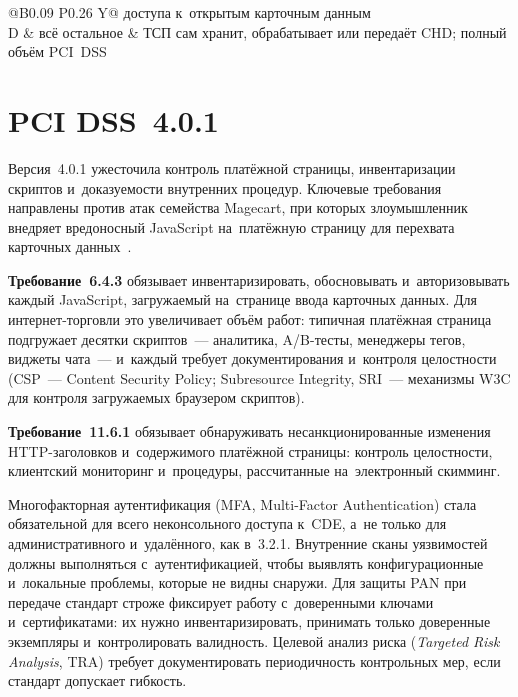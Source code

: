 \begin{table}[tbp]
\begin{minipage}{\textwidth}
\begin{tabularx}{\textwidth}{@{}B{0.09\textwidth} P{0.26\textwidth} Y@{}}
      доступа к~открытым карточным данным \\
      \rowsep
      D & всё остальное &
      ТСП сам хранит, обрабатывает или передаёт CHD; полный объём PCI~DSS \\
      \bottomrule
    \end{tabularx}
    \par\smallskip
  \end{minipage}\par
  \endgroup
\end{table}

\section{PCI DSS~4.0.1}\label{sec:pci-401}

Версия~4.0.1 ужесточила контроль платёжной страницы, инвентаризации скриптов
и~доказуемости внутренних процедур. Ключевые требования направлены против атак
семейства Magecart, при которых злоумышленник внедряет вредоносный JavaScript
на~платёжную страницу для перехвата карточных данных~\cite{pci-dss-4}.

\textbf{Требование~6.4.3} обязывает инвентаризировать, обосновывать
и~авторизовывать каждый JavaScript, загружаемый на~странице ввода карточных
данных. Для интернет-торговли это увеличивает объём работ: типичная платёжная
страница подгружает десятки скриптов~--- аналитика, A/B-тесты, менеджеры тегов,
виджеты чата~--- и~каждый требует документирования и~контроля целостности
(CSP~--- Content Security Policy; Subresource Integrity, SRI~--- механизмы W3C
для контроля загружаемых браузером скриптов).

\textbf{Требование~11.6.1} обязывает обнаруживать несанкционированные изменения
HTTP-заголовков и~содержимого платёжной страницы: контроль целостности,
клиентский мониторинг и~процедуры, рассчитанные на~электронный скимминг.

Многофакторная аутентификация (MFA, Multi-Factor Authentication) стала
обязательной для всего неконсольного доступа к~CDE, а~не только для
административного и~удалённого, как в~3.2.1. Внутренние сканы уязвимостей должны выполняться
с~аутентификацией, чтобы выявлять конфигурационные и~локальные
проблемы, которые не видны снаружи. Для защиты PAN при передаче стандарт
строже фиксирует работу с~доверенными ключами и~сертификатами: их нужно
инвентаризировать, принимать только доверенные экземпляры и~контролировать
валидность. Целевой анализ риска (\textit{Targeted Risk Analysis}, TRA) требует документировать периодичность
контрольных мер, если стандарт допускает гибкость.

